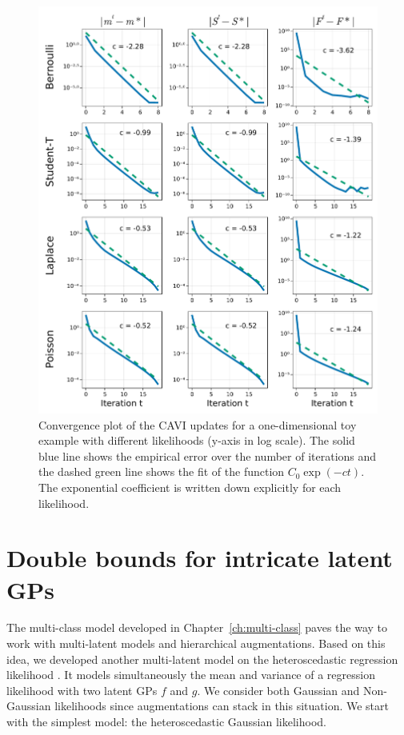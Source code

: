 \begin{figure}[H]
\centering
\includegraphics[width=\textwidth]{./chapters/8_discussions/figures/convergence.pdf}
\caption{Convergence plot of the \ac{CAVI} updates for a one-dimensional toy example with different likelihoods (y-axis in log scale).
The solid blue line shows the empirical error over the number of iterations and the dashed green line shows the fit of the function $C_0 \exp(-c t)$.
The exponential coefficient is written down explicitly for each likelihood.}
\label{fig:convergence}
\end{figure}


\section{Double bounds for intricate latent GPs}
\label{sec:heteroscedastic}
The multi-class model developed in Chapter~\ref{ch:multi-class} paves the way to work with multi-latent models and hierarchical augmentations.
Based on this idea, we developed another multi-latent model on the heteroscedastic regression likelihood  \cite{wangGaussianProcessRegression2012,lazaro2011variational}.
It models simultaneously the mean and variance of a regression likelihood with two latent \ac{GPs} $f$ and $g$.
We consider both Gaussian and Non-Gaussian likelihoods since augmentations can stack in this situation.
We start with the simplest model: the heteroscedastic Gaussian likelihood.

